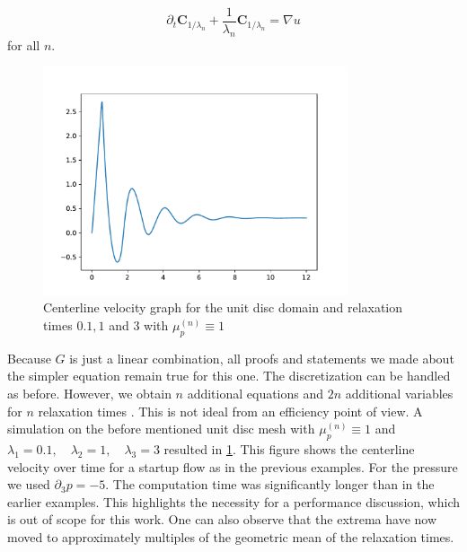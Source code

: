 \documentclass[12pt,a4paper,twoside, open=right]{scrreprt}
\theoremstyle{definition}
\theoremstyle{plain}
\newcommand{\bfC}{\bm{C}}
\begin{document}
\begin{equation}
    \partial_t \bfC_{1/\lambda_n}+\frac{1}{\lambda_n}\bfC_{1/\lambda_n}=\nabla u
\end{equation}
for all $n$.
\begin{figure}
    \centering
    \includegraphics[width=0.8\textwidth]{multilam}
    \caption{Centerline velocity graph for the unit disc domain and relaxation times $0.1,1$ and 3 with $\mu_p^{(n)}\equiv 1$}
    \label{fig:multilam}
\end{figure}
Because $G$ is just a linear combination, all proofs and statements we made about the simpler equation remain true for this one. The discretization can be handled as before. However, we obtain $n$ additional equations and $2n$ additional variables for $n$ relaxation times . This is not ideal from an efficiency point of view. A simulation on the before mentioned unit disc mesh with $\mu_p^{(n)}\equiv 1$ and $\lambda_1=0.1,\quad\lambda_2=1,\quad\lambda_3 =3$ resulted in \ref{fig:multilam}. This figure shows the centerline velocity over time for a startup flow as in the previous examples. For the pressure we used $\partial_3 p=-5$. The computation time was significantly longer than in the earlier examples. This highlights the necessity for a performance discussion, which is out of scope for this work. One can also observe that the extrema have now moved to approximately multiples of the geometric mean of the relaxation times.
\end{document}
